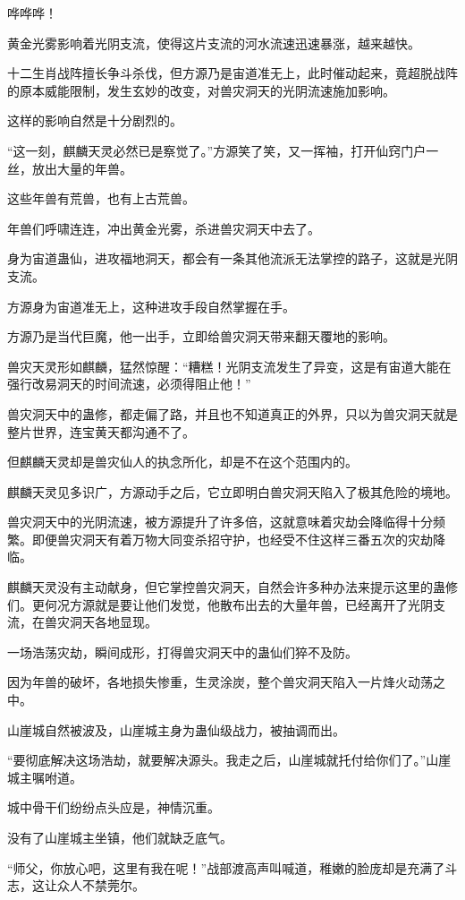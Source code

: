 \begin{this_body}
哗哗哗！

黄金光雾影响着光阴支流，使得这片支流的河水流速迅速暴涨，越来越快。

十二生肖战阵擅长争斗杀伐，但方源乃是宙道准无上，此时催动起来，竟超脱战阵的原本威能限制，发生玄妙的改变，对兽灾洞天的光阴流速施加影响。

这样的影响自然是十分剧烈的。

“这一刻，麒麟天灵必然已是察觉了。”方源笑了笑，又一挥袖，打开仙窍门户一丝，放出大量的年兽。

这些年兽有荒兽，也有上古荒兽。

年兽们呼啸连连，冲出黄金光雾，杀进兽灾洞天中去了。

身为宙道蛊仙，进攻福地洞天，都会有一条其他流派无法掌控的路子，这就是光阴支流。

方源身为宙道准无上，这种进攻手段自然掌握在手。

方源乃是当代巨魔，他一出手，立即给兽灾洞天带来翻天覆地的影响。

兽灾天灵形如麒麟，猛然惊醒：“糟糕！光阴支流发生了异变，这是有宙道大能在强行改易洞天的时间流速，必须得阻止他！”

兽灾洞天中的蛊修，都走偏了路，并且也不知道真正的外界，只以为兽灾洞天就是整片世界，连宝黄天都沟通不了。

但麒麟天灵却是兽灾仙人的执念所化，却是不在这个范围内的。

麒麟天灵见多识广，方源动手之后，它立即明白兽灾洞天陷入了极其危险的境地。

兽灾洞天中的光阴流速，被方源提升了许多倍，这就意味着灾劫会降临得十分频繁。即便兽灾洞天有着万物大同变杀招守护，也经受不住这样三番五次的灾劫降临。

麒麟天灵没有主动献身，但它掌控兽灾洞天，自然会许多种办法来提示这里的蛊修们。更何况方源就是要让他们发觉，他散布出去的大量年兽，已经离开了光阴支流，在兽灾洞天各地显现。

一场浩荡灾劫，瞬间成形，打得兽灾洞天中的蛊仙们猝不及防。

因为年兽的破坏，各地损失惨重，生灵涂炭，整个兽灾洞天陷入一片烽火动荡之中。

山崖城自然被波及，山崖城主身为蛊仙级战力，被抽调而出。

“要彻底解决这场浩劫，就要解决源头。我走之后，山崖城就托付给你们了。”山崖城主嘱咐道。

城中骨干们纷纷点头应是，神情沉重。

没有了山崖城主坐镇，他们就缺乏底气。

“师父，你放心吧，这里有我在呢！”战部渡高声叫喊道，稚嫩的脸庞却是充满了斗志，这让众人不禁莞尔。


\end{this_body}
